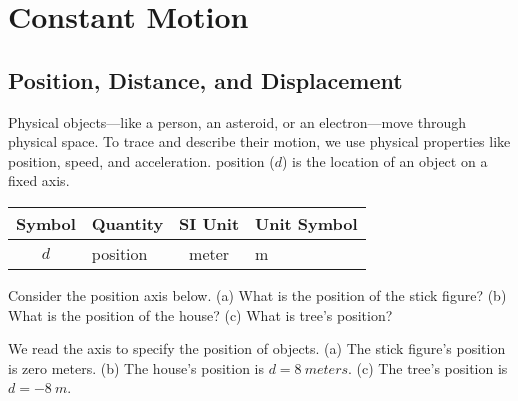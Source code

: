 \documentclass[main.tex]{subfiles}
\begin{document}
\section{Constant Motion}

\subsection{Position, Distance, and Displacement} \label{pdfqW3}


Physical objects---like a person, an asteroid, or an electron---move through physical space. To trace and describe their motion, we use physical properties like position, speed, and acceleration. \Gls{position} ($d$) is the location of an object on a fixed axis.

\begin{center}
    \begin{tabular}{cl|cl}
    \hline
    \textbf{Symbol} & \textbf{Quantity} & \textbf{SI Unit} & \textbf{Unit Symbol}  \\
    \hline\hline
        $d$ & position & meter & m\\
    \hline
    \end{tabular}
\end{center}

\begin{example} \label{xNmqo7}
    Consider the position axis below. (a) What is the position of the stick figure? (b) What is the position of the house? (c) What is tree's position? 
\end{example}


\begin{center}
    \captionsetup{type=figure,margin=1in,font=scriptsize}
\end{center}

\Solution We read the axis to specify the position of objects. (a) The stick figure's position is zero meters. (b) The house's position is $d = \SI{8}{meters}$. (c) The tree's position is $d = \SI{-8}{m}$.
\end{document}
